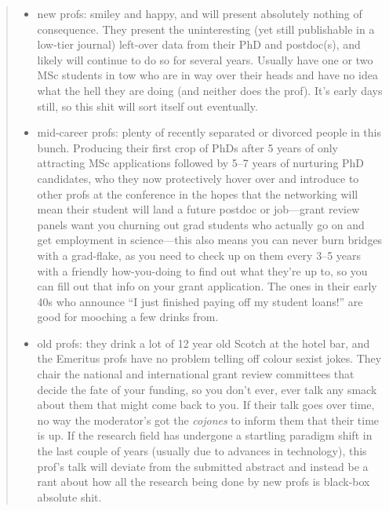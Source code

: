 \documentclass[a4paper]{article}
\begin{document}
\begin{quote}
\begin{enumerate}
\begin{itemize}
\item new profs: smiley and happy, and will present absolutely nothing
of consequence. They present the uninteresting (yet still publishable
in a low-tier journal) left-over data from their PhD and postdoc(s),
and likely will continue to do so for several years. Usually have one
or two MSc students in tow who are in way over their heads and have
no idea what the hell they are doing (and neither does the prof). It's
early days still, so this shit will sort itself out eventually.

\item mid-career profs: plenty of recently separated or divorced people
in this bunch. Producing their first crop of PhDs after 5 years of
only attracting MSc applications followed by 5--7 years of nurturing
PhD candidates, who they now protectively hover over and introduce to
other profs at the conference in the hopes that the networking will
mean their student will land a future postdoc or job---grant review
panels want you churning out grad students who actually go on and get
employment in science---this also means you can never burn bridges with
a grad-flake, as you need to check up on them every 3--5 years with a
friendly how-you-doing to find out what they're up to, so you can fill
out that info on your grant application. The ones in their early 40s
who announce ``I just finished paying off my student loans!'' are good
for mooching a few drinks from.

\item old profs: they drink a lot of 12 year old Scotch at the hotel bar, and
the Emeritus profs have no problem telling off colour sexist jokes. They
chair the national and international grant review committees that decide
the fate of your funding, so you don't ever, ever talk any smack about
them that might come back to you. If their talk goes over time, no way
the moderator's got the {\it cojones} to inform them that their time is up. If
the research field has undergone a startling paradigm shift in the last
couple of years (usually due to advances in technology), this prof's
talk will deviate from the submitted abstract and instead be a rant about
how all the research being done by new profs is black-box absolute shit.
\end{itemize}
\end{enumerate}
\citet{RYS2010a}
\end{quote}
\end{document}
